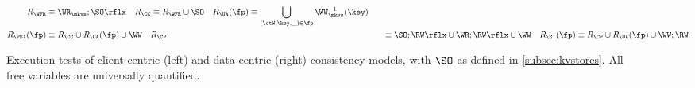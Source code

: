 \begin{figure*}[!t]
{\small
\begin{align*}
	R_{\WFR} & \equiv \WR_{\mkvs} ; \SO\rflx \quad
	R_{\CC} \equiv R_{\WFR} \cup \SO \quad
	R_{\UA}(\fp) \equiv \bigcup_{(\otW, \key, \_) \in \fp} \WW^{-1}_{\mkvs}(\key) \quad \\
	R_{\PSI}(\fp) &\equiv R_{\CC} \cup R_{\UA}(\fp) \cup \WW \quad
	R_{\CP} &\equiv \SO;\RW\rflx \cup \WR;\RW\rflx \cup \WW
	\quad
	R_{\SI}(\fp) \equiv R_{\CP} \cup R_{\UA}(\fp) \cup \WW;\RW
\end{align*}
%
%
}%
%
\hrulefill

\caption{Execution tests of client-centric (left) and data-centric (right) consistency models, 
with $\SO$ as defined in \cref{subsec:kvstores}. 
All free variables are universally quantified.
}
\label{fig:execution.tests}
\label{fig:execution_tests}
\label{fig:execution-tests}
\end{figure*}
